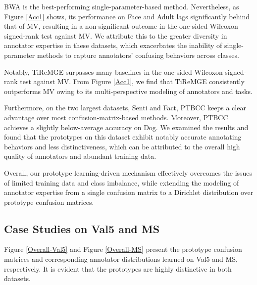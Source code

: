 \documentclass[letterpaper]{article} %
\begin{document}
BWA is the best-performing single-parameter-based method. Nevertheless, as Figure \ref{Acc1} shows, its performance on Face and Adult lags significantly behind that of MV, resulting in a non-significant outcome in the one-sided Wilcoxon signed-rank test against MV. We attribute this to the greater diversity in annotator expertise in these datasets, which exacerbates the inability of single-parameter methods to capture annotators' confusing behaviors across classes.

Notably, TiReMGE surpasses many baselines in the one-sided Wilcoxon signed-rank test against MV. From Figure \ref{Acc1}, we find that TiReMGE consistently outperforms MV owing to its multi-perspective modeling of annotators and tasks.

Furthermore, on the two largest datasets, Senti and Fact, PTBCC keeps a clear advantage over most confusion-matrix-based methods. Moreover, PTBCC achieves a slightly below-average accuracy on Dog. We examined the results and found that the prototypes on this dataset exhibit notably accurate annotating behaviors and less distinctiveness, which can be attributed to the overall high quality of annotators and abundant training data.

Overall, our prototype learning-driven mechanism effectively overcomes the issues of limited training data and class imbalance, while extending the modeling of annotator expertise from a single confusion matrix to a Dirichlet distribution over prototype confusion matrices.
\subsection{Case Studies on Val5 and MS}
Figure \ref{Overall-Val5} and Figure \ref{Overall-MS} present the prototype confusion matrices and corresponding annotator distributions learned on Val5 and MS, respectively. It is evident that the prototypes are highly distinctive in both datasets.
\end{document}
